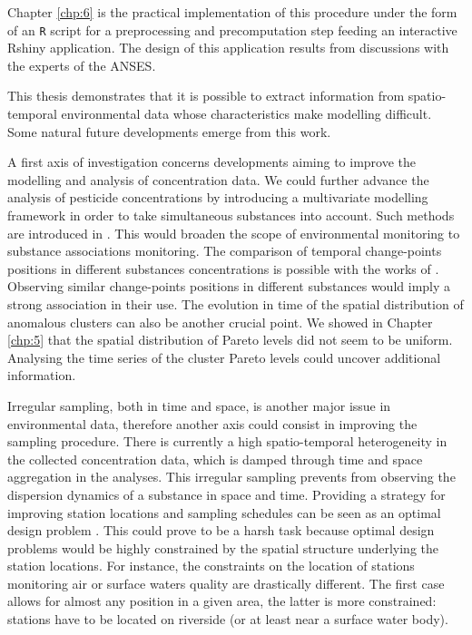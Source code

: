 Chapter \ref{chp:6} is the practical implementation of this procedure under the form of an \texttt{R} script for a preprocessing and precomputation step feeding an interactive Rshiny application. The design of this application results from discussions with the experts of the ANSES.

This thesis demonstrates that it is possible to extract information from spatio-temporal environmental data whose characteristics make modelling difficult. Some natural future developments emerge from this work. 

A first axis of investigation concerns developments aiming to improve the modelling and analysis of concentration data. We could further advance the analysis of pesticide concentrations by introducing a multivariate modelling framework in order to take simultaneous substances into account. Such methods are introduced in \cite{pickering2016changepoint}. This would broaden the scope of environmental monitoring to substance associations monitoring. The comparison of temporal change-points positions in different substances concentrations is possible with the works of \cite{Cleynen2014}. Observing similar change-points positions in different substances would imply a strong association in their use.  The evolution in time of the spatial distribution of anomalous clusters can also be another crucial point. We showed in Chapter \ref{chp:5} that the spatial distribution of Pareto levels did not seem to be uniform. Analysing the time series of the cluster Pareto levels could uncover additional information.

Irregular sampling, both in time and space, is another major issue in environmental data, therefore another axis could consist in improving the sampling procedure. There is currently a high spatio-temporal heterogeneity in the collected concentration data, which is damped through time and space aggregation in the analyses. This irregular sampling prevents from observing the dispersion dynamics of a substance in space and time. Providing a strategy for improving station locations and sampling schedules can be seen as an optimal design problem \citep{Mueller2011,Marsh2012}. This could prove to be a harsh task because optimal design problems would be highly constrained by the spatial structure underlying the station locations. For instance, the constraints on the location of stations monitoring air or surface waters quality are drastically different. The first case allows for almost any position in a given area, the latter is more constrained: stations have to be located on riverside (or at least near a surface water body).

